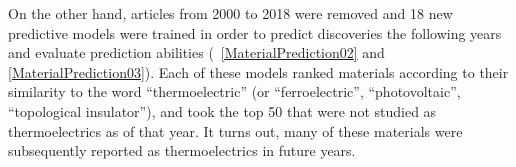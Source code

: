 \newline
On the other hand, articles from 2000 to 2018 were removed and 18 new predictive models were trained in order to predict discoveries the following years and evaluate prediction abilities (\figs~\ref{MaterialPrediction02} and \ref{MaterialPrediction03}).
Each of these models ranked materials according to their similarity to the word “thermoelectric” (or “ferroelectric”, “photovoltaic”, “topological insulator”), and took the top 50 that were not studied as thermoelectrics as of that year. It turns out, many of these materials were subsequently reported as thermoelectrics in future years.
\newline

